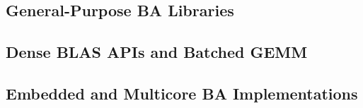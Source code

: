 \subsection{General-Purpose BA Libraries}
\label{sec:ba_libs}


\subsection{Dense BLAS APIs and Batched GEMM}
\label{sec:blas}


\subsection{Embedded and Multicore BA Implementations}
\label{sec:embedded}


